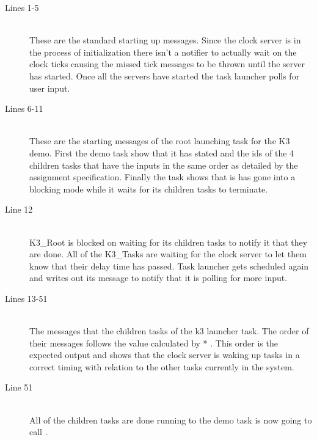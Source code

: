 \documentclass[pdftex,10pt,a4paper]{article}
\begin{document}
\newpage
\begin{description}
\item[Lines 1-5] \hfill \\
These are the standard starting up messages. Since the clock server is in the 
process of initialization there isn't a notifier to actually wait on the clock
ticks causing the missed tick messages to be thrown until the server has
started. Once all the servers have started the task launcher polls for user
input.

\item[Lines 6-11] \hfill \\
These are the starting messages of the root launching task for the K3 demo.
First the demo task show that it has stated and the ids of the 4 children
tasks that have the inputs in the same order as detailed by the assignment
specification. Finally the task shows that is has gone into a blocking mode
while it waits for its children tasks to terminate.

\item[Line 12] \hfill \\
K3\_Root is blocked on waiting for its children tasks to notify it that they
are done. All of the K3\_Tasks are waiting for the clock server to let them
know that their delay time has passed. Task launcher gets scheduled again
and writes out its message to notify that it is polling for more input.

\item[Lines 13-51] \hfill \\
The messages that the children tasks of the k3 launcher task. The order of
their messages follows the value calculated by  * . This
order is the expected output and shows that the clock server is waking up tasks
in a correct timing with relation to the other tasks currently in the system.

\item[Line 51] \hfill \\
All of the children tasks are done running to the demo task is now going to call
.

\end{description}
\end{document}
